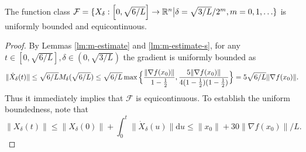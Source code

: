 \documentclass[twoside,11pt]{article}
\newcommand{\der}[1]{\dot #1}
\newcommand{\norm}[1]{\|#1\|}
\newcommand{\R}{\mathbb{R}}
\renewcommand{\d}{{\mathrm{d}}}
\def\half{\frac{1}{2}}
\begin{document}
\begin{lemma}\label{lm:arzela}
The function class $\mathcal{F} = \{X_{\delta}: \left[ 0, \sqrt{6/L}\right] \rightarrow \R^n \big{|} \delta = \sqrt{3/L}/2^m, m = 0, 1, \ldots\}$ is uniformly bounded and equicontinuous.
\end{lemma}
\begin{proof}
By Lemmas \ref{lm:m-estimate} and \ref{lm:m-estimate-s}, for any $t\in [0, \sqrt{6/L}], \delta\in (0, \sqrt{3/L})$ the gradient is uniformly bounded as
\begin{align*}
\norm{\der{X_{\delta}}(t)} \le \sqrt{6/L}M_{\delta}(\sqrt{6/L}) \le \sqrt{6/L}\max\Big{\{}\frac{\norm{\nabla f(x_0)}}{1 - \half}, \frac{5\norm{\nabla f(x_0)}}{4(1-\half)(1-\half)}\Big{\}} = 5\sqrt{6/L}\norm{\nabla f(x_0)}.
\end{align*}
Thus it immediately implies that $\mathcal{F}$ is equicontinuous. To establish the uniform boundedness, note that
\begin{equation}\nonumber
\norm{X_{\delta}(t)} \le \norm{X_{\delta}(0)} + \int_0^t\norm{\der{X_{\delta}}(u)}\d u \le \norm{x_0} + 30\norm{\nabla f(x_0)}/L.
\end{equation}
\end{proof}
\end{document}
